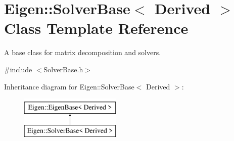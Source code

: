 \hypertarget{class_eigen_1_1_solver_base}{}\section{Eigen\+::Solver\+Base$<$ Derived $>$ Class Template Reference}
\label{class_eigen_1_1_solver_base}


A base class for matrix decomposition and solvers.  




{\ttfamily \#include $<$Solver\+Base.\+h$>$}

Inheritance diagram for Eigen\+::Solver\+Base$<$ Derived $>$\+:\begin{figure}[H]
\begin{center}
\leavevmode
\includegraphics[height=2.000000cm]{class_eigen_1_1_solver_base}
\end{center}
\end{figure}
